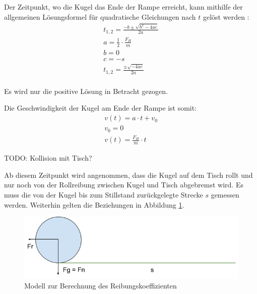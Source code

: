 Der Zeitpunkt, wo die Kugel das Ende der Rampe erreicht, kann mithilfe der allgemeinen Lösungsformel für quadratische Gleichungen nach $t$ gelöst werden \cite{wiki.mitternachtsformel:1}:
\begin{align}
    t_{1,2} = \frac{-b \pm \sqrt{b^2 - 4ac}}{2a}\\
    a = \frac{1}{2} \cdot \frac{F_H}{m}\\
    b = 0\\
    c = -s\\
    t_{1,2} = \frac{\pm \sqrt{-4ac}}{2a}\\
\end{align}

Es wird nur die positive Lösung in Betracht gezogen.

Die Geschwindigkeit der Kugel am Ende der Rampe ist somit:
\begin{align}
    v(t) = a \cdot t + v_0\\
    v_0 = 0\\
    v(t) = \frac{F_H}{m} \cdot t
\end{align}

TODO: Kollision mit Tisch?

Ab diesem Zeitpunkt wird angenommen, dass die Kugel auf dem Tisch rollt und nur noch von der Rollreibung zwischen Kugel und Tisch abgebremst wird.
Es muss die von der Kugel bis zum Stillstand zurückgelegte Strecke $s$ gemessen werden.
Weiterhin gelten die Beziehungen in Abbildung \ref{fig:modell_reibungskoeffizient}.

\begin{figure}[h!]
    \begin{center}
        \includegraphics[width=0.5\linewidth]{../common/07_appendix/resources/01_reibungskoeffizient_tisch.png}
    \end{center}
    \caption{Modell zur Berechnung des Reibungskoeffizienten}
    \label{fig:modell_reibungskoeffizient}
\end{figure}

